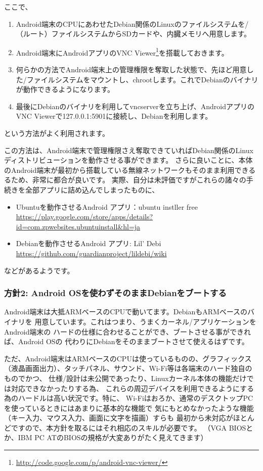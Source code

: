 \documentclass[mingoth,a4paper]{jsarticle}
\begin{document}
ここで、
\begin{enumerate}
\item Android端末のCPUにあわせたDebian関係のLinuxのファイルシステムを/（ルート）ファイルシステムからSDカードや、内臓メモリへ用意します。
\item Android端末にAndroidアプリのVNC Viewer\footnote{\url{http://code.google.com/p/android-vnc-viewer/}}を搭載しておきます。
\item 何らかの方法でAndroid端末上の管理権限を奪取した状態で、先ほど用意した/ファイルシステムをマウントし、chrootします。これでDebianのバイナリが動作できるようになります。
\item 最後にDebianのバイナリを利用してvncserverを立ち上げ、AndroidアプリのVNC Viewerで127.0.0.1:5901に接続し、Debianを利用します。
\end{enumerate}
という方法がよく利用されます。

この方法は、Android端末で管理権限さえ奪取できていればDebian関係のLinuxディストリビューションを動作させる事ができます。
さらに良いことに、本体のAndroid端末が最初から搭載している無線ネットワークもそのまま利用できるるため、非常に都合が良いです。
実際、自分は未評価ですがこれらの諸々の手続きを全部アプリに詰め込んでしまったものに、

\begin{itemize}
\item Ubuntuを動作させるAndroid アプリ：ubuntu instller free \url{https://play.google.com/store/apps/details?id=com.zpwebsites.ubuntuinstall&hl=ja}
\item Debianを動作させるAndroid アプリ: Lil' Debi \url{https://github.com/guardianproject/lildebi/wiki}
\end{itemize}
などがあるようです。

\subsubsection{方針2: Android OSを使わずそのままDebianをブートする}

Android端末は大抵ARMベースのCPUで動いてます。DebianもARMベースのバイナリを
用意しています。これはつまり、うまくカーネル/アプリケーションをAndroid端末の
ハードの仕様に合わせることができ、ブートさせる事ができれば、Android OSの
代わりにDebianをそのままブートさせて使えるはずです。

ただ、Android端末はARMベースのCPUは使っているものの、グラフィックス
（液晶画面出力）、タッチパネル、サウンド、Wi-Fi等は各端末のハード独自のものでかつ、
仕様/設計は未公開であったり、Linuxカーネル本体の機能だけでは対応できなかったりする為、
これらの周辺デバイスを利用できるようにする為のハードルは高い状況です。特に、
Wi-Fiはおろか、通常のデスクトップPCを使っているときにはあまりに基本的な機能で
気にもとめなかったような機能（キー入力、マウス入力、画面に文字を描画）すらも
最初から未対応がほとんどですので、本方針を取るにはそれ相応のスキルが必要です。
（VGA BIOSとか、IBM PC ATのBIOSの規格が大変ありがたく見えてきます）
\end{document}
